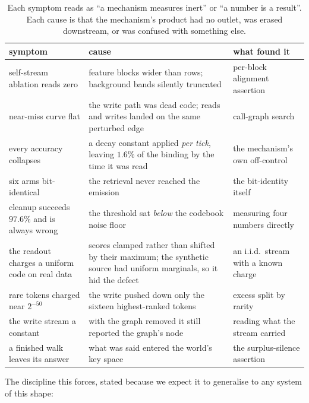 \documentclass[11pt,a4paper]{article}
\theoremstyle{plain}
\theoremstyle{definition}
\theoremstyle{remark}
\begin{document}
\begin{table}[h]
\centering
\small
\begin{tabular}{p{4.2cm}p{5.6cm}p{4.1cm}}
\toprule
symptom & cause & what found it \\
\midrule
self-stream ablation reads zero & feature blocks wider than rows; background
bands silently truncated & per-block alignment assertion \\
near-miss curve flat & the write path was dead code; reads and writes landed on
the same perturbed edge & call-graph search \\
every accuracy collapses & a decay constant applied \emph{per tick}, leaving
$1.6\%$ of the binding by the time it was read & the mechanism's own off-control \\
six arms bit-identical & the retrieval never reached the emission & the
bit-identity itself \\
cleanup succeeds $97.6\%$ and is always wrong & the threshold sat \emph{below}
the codebook noise floor & measuring four numbers directly \\
the readout charges a uniform code on real data & scores clamped rather than
shifted by their maximum; the synthetic source had uniform marginals, so it hid
the defect & an i.i.d.\ stream with a known charge \\
rare tokens charged near $2^{-50}$ & the write pushed down only the sixteen
highest-ranked tokens & excess split by rarity \\
the write stream a constant & with the graph removed it still reported the
graph's node & reading what the stream carried \\
a finished walk leaves its answer & what was said entered the world's key
space & the surplus-silence assertion \\
\bottomrule
\end{tabular}
\caption{Each symptom reads as ``a mechanism measures inert'' or ``a number
is a result''. Each cause is that the mechanism's product had no outlet, was
erased downstream, or was confused with something else.}
\label{tab:failures}
\end{table}

The discipline this forces, stated because we expect it to generalise to any
system of this shape:
\end{document}
